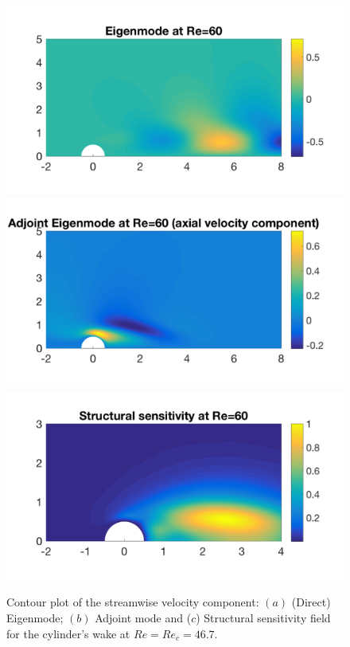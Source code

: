 \documentclass[twocolumn,10pt]{asme2ej}
\begin{document}
\begin{figure}
\includegraphics[width=.9 \linewidth]{Cylinder_EigenModeRe60.png}
\includegraphics[width=.9 \linewidth]{Cylinder_EigenModeAdjRe60.png}
\includegraphics[width=.9 \linewidth]{Cylinder_SensitivityRe60.png}
\caption{Contour plot of the streamwise velocity component: $(a)$ (Direct) Eigenmode; $(b)$ Adjoint mode and ($c$) Structural sensitivity field for the cylinder's wake at $Re=Re_c = 46.7$.}
\label{fig:Eigenmode}
\end{figure}
\end{document}
